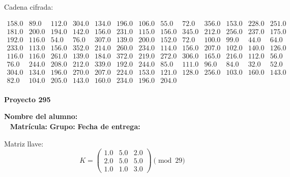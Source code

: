 \documentclass[12pt]{article}
\begin{document}
Cadena cifrada:
\begin{center}
$\begin{array}{lllllllllllll}
158.0 & 89.0 & 112.0 & 304.0 & 134.0 & 196.0 & 106.0 & 55.0 & 72.0 & 356.0 & 153.0 & 228.0 & 251.0\\
181.0 & 200.0 & 194.0 & 142.0 & 156.0 & 231.0 & 115.0 & 156.0 & 345.0 & 212.0 & 256.0 & 237.0 & 175.0\\
192.0 & 116.0 & 54.0 & 76.0 & 307.0 & 139.0 & 200.0 & 152.0 & 72.0 & 100.0 & 99.0 & 44.0 & 64.0\\
233.0 & 113.0 & 156.0 & 352.0 & 214.0 & 260.0 & 234.0 & 114.0 & 156.0 & 207.0 & 102.0 & 140.0 & 126.0\\
116.0 & 116.0 & 261.0 & 139.0 & 184.0 & 372.0 & 219.0 & 272.0 & 306.0 & 165.0 & 216.0 & 112.0 & 56.0\\
76.0 & 244.0 & 208.0 & 212.0 & 339.0 & 192.0 & 244.0 & 85.0 & 111.0 & 96.0 & 84.0 & 32.0 & 52.0\\
304.0 & 134.0 & 196.0 & 270.0 & 207.0 & 224.0 & 153.0 & 121.0 & 128.0 & 256.0 & 103.0 & 160.0 & 143.0\\
82.0 & 104.0 & 205.0 & 143.0 & 160.0 & 234.0 & 196.0 & 204.0\\
\end{array}$
\end{center}

\newpage


\textbf{Proyecto 295}

\textbf{Nombre del alumno:} \underline{\hspace{13cm}}\\\
\vspace{1cm}
\textbf{Matrícula:} \underline{\hspace{4cm}} \hspace{1cm}
\textbf{Grupo:} \underline{\hspace{2cm}}
\textbf{Fecha de entrega:} \underline{\hspace{2cm}}

\medskip

Matriz llave:
\[
K = \begin{pmatrix}
1.0 & 5.0 & 2.0\\
2.0 & 5.0 & 5.0\\
1.0 & 1.0 & 3.0
\end{pmatrix} \pmod{29}
\]
\end{document}
